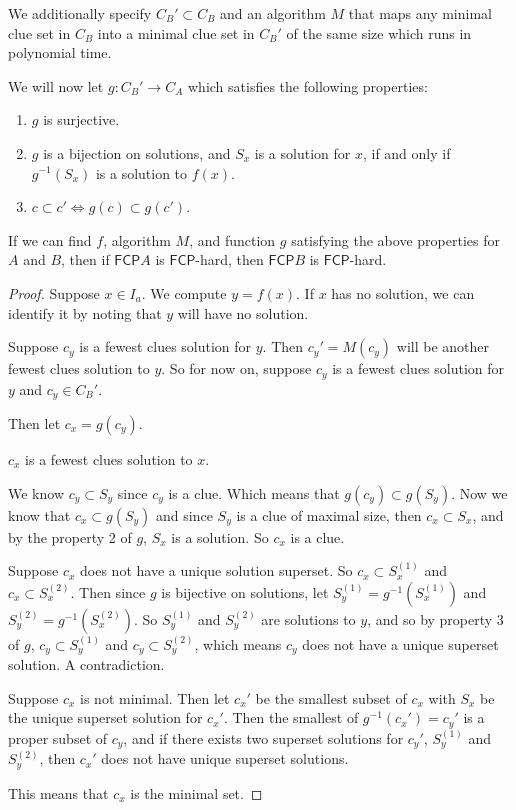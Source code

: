 \documentclass[runningheads,a4paper]{llncs}
\begin{document}
We additionally specify $C_B' \subset C_B$ and an algorithm $M$ that maps any minimal clue set in $C_B$ into a minimal clue set in $C_B'$ of the same size which runs in polynomial time.

We will now let $g: C_B' \rightarrow C_A$ which satisfies the following properties:
\begin{enumerate}
\item $g$ is surjective.
\item $g$ is a bijection on solutions, and $S_x$ is a solution for $x$, if and only if $g^{-1}(S_x)$ is a solution to $f(x)$. 
\item $c \subset c' \iff g(c) \subset g(c')$. 
\end{enumerate}

\begin{theorem}
If we can find $f$, algorithm $M$, and function $g$ satisfying the above properties for $A$ and $B$, then if $\mathsf{FCP}A$ is $\mathsf{FCP}$-hard, then $\mathsf{FCP} B$ is $\mathsf{FCP}$-hard.
\end{theorem}

\begin{proof}
Suppose $x \in I_a$. We compute $y = f(x)$. If $x$ has no solution, we can identify it by noting that $y$ will have no solution.

Suppose $c_y$ is a fewest clues solution for $y$. Then $c_y' = M(c_y)$ will be another fewest clues solution to $y$. So for now on, suppose $c_y$ is a fewest clues solution for $y$ and $c_y \in C_B'$.

Then let $c_x = g(c_y)$. 

\begin{claim}
$c_x$ is a fewest clues solution to $x$.
\end{claim}

We know $c_y \subset S_y$ since $c_y$ is a clue. Which means that $g(c_y) \subset g(S_y)$.
Now we know that $c_x \subset g(S_y)$ and since $S_y$ is a clue of maximal size, then $c_x \subset S_x$, and by the property 2 of $g$, $S_x$ is a solution. So $c_x$ is a clue.

Suppose $c_x$ does not have a unique solution superset. So $c_x \subset S_x^{(1)}$ and $c_x \subset S_x^{(2)}$. Then since $g$ is bijective on solutions, let $S_y^{(1)}=g^{-1}(S_x^{(1)})$ and $S_y^{(2)}=g^{-1}(S_x^{(2)})$. So $S_y^{(1)}$ and $S_y^{(2)}$ are solutions to $y$, and so by property 3 of $g$, $c_y \subset S_y^{(1)}$ and $c_y \subset S_{y}^{(2)}$, which means $c_y$ does not have a unique superset solution. A contradiction.

Suppose $c_x$ is not minimal. Then let $c_x'$ be the smallest subset of $c_x$ with $S_x$ be the unique superset solution for $c_x'$. Then the smallest of $g^{-1}(c_x') = c_y'$ is a proper subset of $c_y$, and if there exists two superset solutions for $c_y'$, $S_y^{(1)}$ and $S_y^{(2)}$, then $c_x'$ does not have unique superset solutions.

This means that $c_x$ is the minimal set.
\end{proof}
\end{document}
